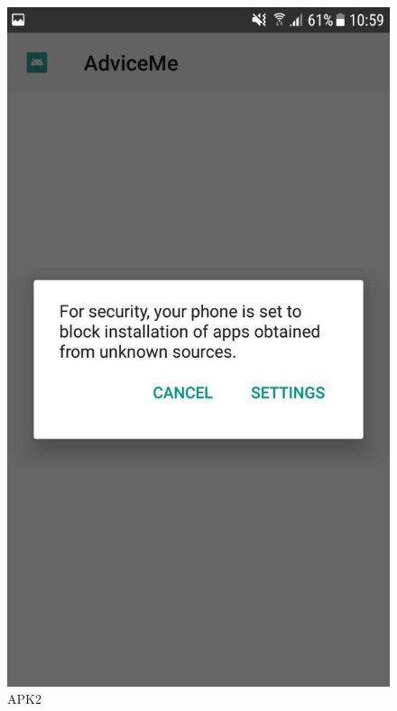 \begin{figure}[h!]
\begin{minipage}[t]{0.48\textwidth}
\includegraphics[width=\linewidth,keepaspectratio=true]{img/apk2.jpg}
\caption{APK2}
\label{fig:APK2}
\end{minipage}
\end{figure}

